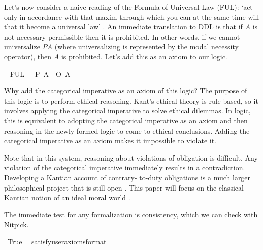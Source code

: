 \begin{isabellebody}
\begin{isamarkuptext}
Let's now consider a naive reading of the Formula of Universal Law (FUL): `act only in accordance 
with that maxim through which you can at the same time will that it become a universal law' \cite{groundwork}.
An immediate translation to DDL is that if $A$ is not necessary permissible then it is prohibited. In other
words, if we cannot universalize $P A$ (where universalizing is represented by the modal necessity 
operator), then $A$ is prohibited. Let's add this as an axiom to our logic.%
\end{isamarkuptext}\isamarkuptrue%
\isamarkupfalse%
\ \isanewline
FUL{\isacharunderscore}{}{\isacharcolon}\ {\isachardoublequoteopen}{\isasymTurnstile}\ {\isacharparenleft}{\isacharparenleft}\isactrlbold {\isasymnot}{\isacharparenleft}{\isasymbox}\ {\isacharparenleft}P\ A{\isacharparenright}{\isacharparenright}{\isacharparenright}\ \isactrlbold {\isasymrightarrow}\ {\isacharparenleft}O\ {\isacharbraceleft}{\isacharparenleft}\isactrlbold {\isasymnot}A{\isacharparenright}{\isacharbraceright}{\isacharparenright}{\isacharparenright}{\isachardoublequoteclose}%
\begin{isamarkuptext}%
Why add the categorical imperative as an axiom of this logic? The purpose of this logic is to 
perform ethical reasoning. Kant's ethical theory is rule based, so it involves applying the categorical
imperative to solve ethical dilemmas. In logic, this is equivalent to adopting the categorical imperative as 
an axiom and then reasoning in the newly formed logic to come to ethical conclusions. Adding the categorical
imperative as an axiom makes it impossible to violate it. 

Note that in this system, reasoning about violations of obligation is difficult. Any violation of the 
categorical imperative immediately results in a contradiction. Developing a Kantian account of contrary-
to-duty obligations is a much larger philosophical project that is still open \cite{KorsgaardRTL}. This paper will focus 
on the classical Kantian notion of an ideal moral world \cite{idealtheory}.

The immediate test for any formalization is consistency, which we can check with Nitpick.%
\end{isamarkuptext}\isamarkuptrue%
\isamarkupfalse%
\ True\ \isamarkupfalse%
\ {\isacharbrackleft}satisfy{\isacharcomma}user{\isacharunderscore}axioms{\isacharcomma}format{\isacharequal}{}{\isacharbrackright}%
\isadelimproof
\ %
\endisadelimproof
%
\isatagproof
{}\isamarkupfalse%
\isanewline
%
\end{isabellebody}
